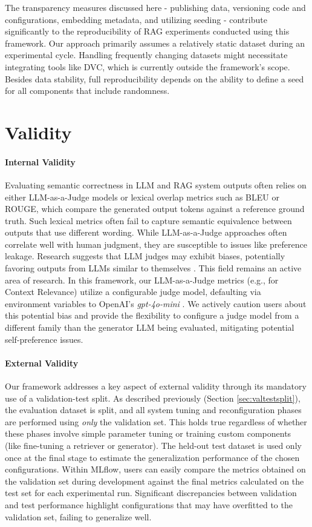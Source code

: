 The transparency measures discussed here - publishing data, versioning code and configurations, embedding metadata, and utilizing seeding - contribute significantly to the reproducibility of RAG experiments conducted using this framework. Our approach primarily assumes a relatively static dataset during an experimental cycle. Handling frequently changing datasets might necessitate integrating tools like DVC, which is currently outside the framework's scope. Besides data stability, full reproducibility depends on the ability to define a seed for all components that include randomness.

\section{Validity}

\paragraph{Internal Validity}
Evaluating semantic correctness in LLM and RAG system outputs often relies on either LLM-as-a-Judge models or lexical overlap metrics such as BLEU or ROUGE, which compare the generated output tokens against a reference ground truth. Such lexical metrics often fail to capture semantic equivalence between outputs that use different wording. While LLM-as-a-Judge approaches often correlate well with human judgment, they are susceptible to issues like preference leakage. Research suggests that LLM judges may exhibit biases, potentially favoring outputs from LLMs similar to themselves \cite{Li.03.02.2025}. This field remains an active area of research. In this framework, our LLM-as-a-Judge metrics (e.g., for Context Relevance) utilize a configurable judge model, defaulting via environment variables to OpenAI's \textit{gpt-4o-mini} \cite{OpenAI_2022}. We actively caution users about this potential bias and provide the flexibility to configure a judge model from a different family than the generator LLM being evaluated, mitigating potential self-preference issues.

\paragraph{External Validity}
Our framework addresses a key aspect of external validity through its mandatory use of a validation-test split. As described previously (Section \ref{sec:valtestsplit}), the evaluation dataset is split, and all system tuning and reconfiguration phases are performed using \textit{only} the validation set. This holds true regardless of whether these phases involve simple parameter tuning or training custom components (like fine-tuning a retriever or generator). The held-out test dataset is used only once at the final stage to estimate the generalization performance of the chosen configurations. Within MLflow, users can easily compare the metrics obtained on the validation set during development against the final metrics calculated on the test set for each experimental run. Significant discrepancies between validation and test performance highlight configurations that may have overfitted to the validation set, failing to generalize well.

